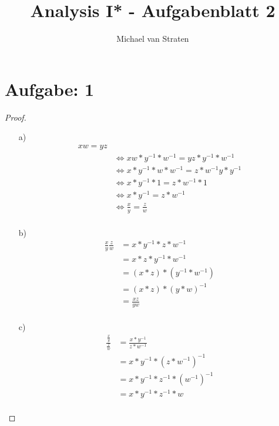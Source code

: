 \documentclass{exam}
\title{Analysis I* - Aufgabenblatt 2}
\author{Michael van Straten}
\begin{document}
\maketitle

\section*{Aufgabe: 1}
\begin{proof}
	\begin{enumerate}
		\item [a)]
		      \begin{align*}
			      xw = yz                                \\
			       & \Leftrightarrow
			      xw*y^{-1}*w^{-1} = yz * y^{-1}*w^{-1}  \\
			       & \Leftrightarrow
			      x*y^{-1}*w*w^{-1} = z*w^{-1} y* y^{-1} \\
			       & \Leftrightarrow
			      x*y^{-1}*1 = z*w^{-1} *1               \\
			       & \Leftrightarrow
			      x*y^{-1} = z*w^{-1}                    \\
			       & \Leftrightarrow
			      \frac{x}{y} = \frac{z}{w}              \\
		      \end{align*}
		\item [b)]
		      \begin{align*}
			      \frac{x}{y} \frac{z}{w} & = x * y^{-1} * z * w^{-1}     \\
			                              & = x * z * y^{-1} * w^{-1}     \\
			                              & = (x * z) * (y^{-1} * w^{-1}) \\
			                              & = (x * z) * {(y * w)}^{-1}    \\
			                              & = \frac{xz}{yw}               \\
		      \end{align*}
		\item [c)]
		      \begin{align*}
			      \frac{\frac{x}{y}}{\frac{z}{w}} & = \frac{x*y^{-1}}{z * w^{-1}}         \\
			                                      & = x*y^{-1} * {(z * w^{-1})}^{-1}      \\
			                                      & = x*y^{-1} * z^{-1} * {(w^{-1})}^{-1} \\
			                                      & = x*y^{-1} * z^{-1} * w               \\

\end{align*}
\end{enumerate}
\end{proof}
\end{document}
